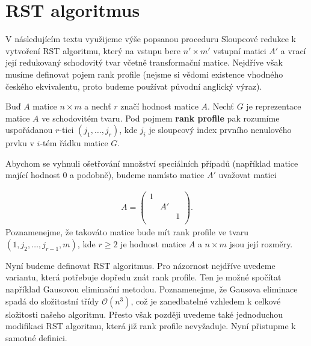 \section{RST algoritmus}
V následujícím textu využijeme výše popsanou proceduru Sloupcové redukce k vytvoření
RST algoritmu, který na vstupu bere $ n' \times m' $ vstupní matici $ A' $ a
vrací její redukovaný schodovitý tvar včetně transformační matice. Nejdříve však
musíme definovat pojem rank profile (nejsme si vědomi existence vhodného českého
ekvivalentu, proto budeme používat původní anglický výraz).

\begin{defi}
Buď $ A $ matice $ n \times m $ a nechť $ r $ značí hodnost matice $ A $. Nechť
$ G $ je reprezentace matice $ A $ ve schodovitém tvaru. Pod pojmem
\textbf{rank profile} pak rozumíme uspořádanou $ r $-tici $ (j_1, \dots, j_r) $, kde
$ j_i $ je sloupcový index prvního nenulového prvku v $ i $-tém řádku matice $ G $.
\end{defi}

Abychom se vyhnuli ošetřování množství speciálních případů (například matice
mající hodnost $ 0 $ a podobně), budeme namísto matice $ A' $ uvažovat matici

\begin{align} \label{input_A}
A =
    \begin{pmatrix}
        1 &    &   \\
          & A' &   \\
          &    & 1 \\
    \end{pmatrix}
.
\end{align}
Poznamenejme, že takováto matice bude mít rank profile ve tvaru
$ (1, j_2, \dots, j_{r - 1}, m) $, kde $ r \geq 2 $ je hodnost matice $ A $ a
$ n \times m $ jsou její rozměry.

Nyní budeme definovat RST algoritmus. Pro názornost nejdříve uvedeme variantu,
která potřebuje dopředu znát rank profile. Ten je možné spočítat například
Gausovou eliminační metodou. Poznamenejme, že Gausova eliminace spadá do složitostní
třídy $ \mathcal{O}(n^3) $, což je zanedbatelné vzhledem k celkové složitosti
našeho algoritmu. Přesto však později uvedeme také jednoduchou modifikaci RST
algoritmu, která již rank profile nevyžaduje. Nyní přistupme k samotné definici.

